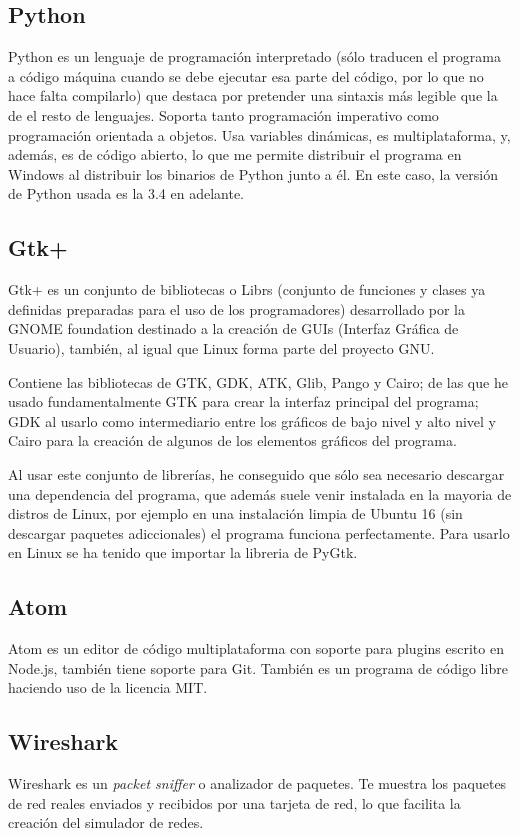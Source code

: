 \documentclass[a4paper, 11pt, twoside]{report} %
\begin{document}
\subsection{Python}
Python es un lenguaje de programación interpretado (sólo traducen el programa a código máquina cuando se debe ejecutar esa parte del código, por lo que no hace falta compilarlo) que destaca por pretender una sintaxis más legible que la de el resto de lenguajes. Soporta tanto programación imperativo como programación orientada a objetos. Usa variables dinámicas, es multiplataforma, y, además, es de código abierto, lo que me permite distribuir el programa en Windows al distribuir los binarios de Python junto a él. En este caso, la versión de Python usada es la 3.4 en adelante.

\subsection{Gtk+}
Gtk+ es un conjunto de bibliotecas o \glspl{Libr} (conjunto de funciones y clases ya definidas preparadas para el uso de los programadores) desarrollado por la GNOME foundation destinado a la creación de GUIs (Interfaz Gráfica de Usuario), también, al igual que Linux forma parte del proyecto GNU.

Contiene las bibliotecas de GTK, GDK, ATK, Glib, Pango y Cairo; de las que he usado fundamentalmente GTK para crear la interfaz principal del programa; GDK al usarlo como intermediario entre los gráficos de bajo nivel y alto nivel y Cairo para la creación de algunos de los elementos gráficos del programa.

Al usar este conjunto de librerías, he conseguido que sólo sea necesario descargar una dependencia del programa, que además suele venir instalada en la mayoria de distros de Linux, por ejemplo en una instalación limpia de Ubuntu 16 (sin descargar paquetes adiccionales) el programa funciona perfectamente. Para usarlo en Linux se ha tenido que importar la libreria de PyGtk.
\subsection{Atom}
Atom es un editor de código multiplataforma con soporte para plugins escrito en Node.js, también tiene soporte para Git. También es un programa de código libre haciendo uso de la licencia MIT.

\subsection{Wireshark}
Wireshark es un \textit{packet sniffer} o analizador de paquetes. Te muestra los paquetes de red reales enviados y recibidos por una tarjeta de red, lo que facilita la creación del simulador de redes.
\end{document}
